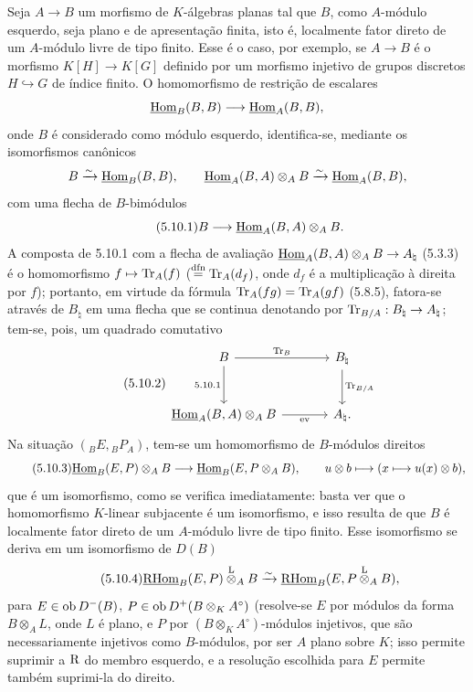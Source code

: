 Seja $A\to B$ um morfismo de $K$-álgebras planas tal que $B$, como $A$-módulo esquerdo, seja plano e de apresentação finita, isto é, localmente fator direto de um $A$-módulo livre de tipo finito. Esse é o caso, por exemplo, se $A\to B$ é o morfismo $K[H]\to K[G]$ definido por um morfismo injetivo de grupos discretos $H\hookrightarrow G$ de índice finito. O homomorfismo de restrição de escalares
\[
\underline{\operatorname{Hom}}_B(B,B)\longrightarrow\underline{\operatorname{Hom}}_A(B,B),
\]
onde $B$ é considerado como módulo esquerdo, identifica-se, mediante os isomorfismos canônicos
\[
B\xrightarrow{\sim}\underline{\operatorname{Hom}}_B(B,B),\qquad \underline{\operatorname{Hom}}_A(B,A)\otimes_AB\xrightarrow{\sim}\underline{\operatorname{Hom}}_A(B,B),
\]
com uma flecha de $B$-bimódulos
\begin{equation}\tag{5.10.1}
B\longrightarrow\underline{\operatorname{Hom}}_A(B,A)\otimes_AB.
\end{equation}
A composta de 5.10.1 com a flecha de avaliação $\underline{\operatorname{Hom}}_A(B,A)\otimes_AB\to A_\natural$ (5.3.3) é o homomorfismo $f\mapsto\operatorname{Tr}_A(f)$ ($\stackrel{\mathrm{dfn}}{=}\operatorname{Tr}_A(d_f)$, onde $d_f$ é a multiplicação à direita por $f$); portanto, em virtude da fórmula $\operatorname{Tr}_A(fg)=\operatorname{Tr}_A(gf)$ (5.8.5), fatora-se através de $B_\natural$ em uma flecha que se continua denotando por $\operatorname{Tr}_{B/A}:B_\natural\to A_\natural$; tem-se, pois, um quadrado comutativo
\begin{equation}\tag{5.10.2}
\begin{tikzcd}[column sep=large,row sep=large]
B \arrow[r,"\Tr_B"] \arrow[d,"5.10.1"'] & B_\natural \arrow[d,"\Tr_{B/A}"]\\
\uHom_A(B,A)\otimes_AB \arrow[r,"\mathrm{ev}"'] & A_\natural .
\end{tikzcd}
\end{equation}
Na situação $({}_BE,{}_BP_A)$, tem-se um homomorfismo de $B$-módulos direitos
\begin{equation}\tag{5.10.3}
\underline{\operatorname{Hom}}_B(E,P)\otimes_AB\longrightarrow\underline{\operatorname{Hom}}_B(E,P\otimes_AB),\qquad
u\otimes b\longmapsto(x\longmapsto u(x)\otimes b),
\end{equation}
que é um isomorfismo, como se verifica imediatamente: basta ver que o homomorfismo $K$-linear subjacente é um isomorfismo, e isso resulta de que $B$ é localmente fator direto de um $A$-módulo livre de tipo finito. Esse isomorfismo se deriva em um isomorfismo de $D(B)$
\begin{equation}\tag{5.10.4}
\underline{\mathrm{RHom}}_B(E,P)\overset{\mathrm L}{\otimes}_AB\xrightarrow{\sim}\underline{\mathrm{RHom}}_B(E,P\overset{\mathrm L}{\otimes}_AB),
\end{equation}
para $E\in\operatorname{ob} D^-(B)$, $P\in\operatorname{ob} D^+(B\otimes_KA^\circ)$ (resolve-se $E$ por módulos da forma $B\otimes_AL$, onde $L$ é plano, e $P$ por $(B\otimes_KA^\circ)$-módulos injetivos, que são necessariamente injetivos como $B$-módulos, por ser $A$ plano sobre $K$; isso permite suprimir a $\mathrm{R}$ do membro esquerdo, e a resolução escolhida para $E$ permite também suprimi-la do direito.

